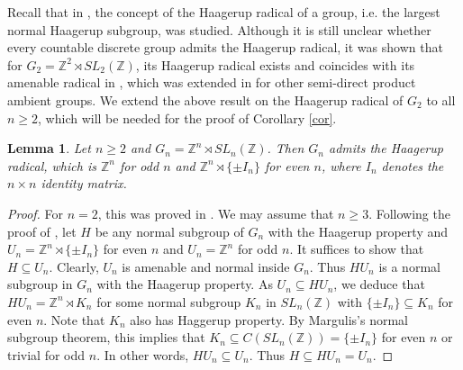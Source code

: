 \documentclass[12pt]{amsart}
\newtheorem{lem}[theorem]{Lemma}
\theoremstyle{definition}
\theoremstyle{remark}
\begin{document}
Recall that in \cite{jiangskalski}, the concept of the Haagerup radical of a group, i.e. the largest normal Haagerup subgroup, was studied. Although it is still unclear whether every countable discrete group admits the Haagerup radical, it was shown that for $G_2=\mathbb{Z}^2\rtimes SL_2(\mathbb{Z})$, its Haagerup radical exists and coincides with its amenable radical in \cite[Proposition 2.10]{jiangskalski}, which was extended in \cite[Proposition 4.1]{valette} for other semi-direct product ambient groups.
We extend the above result on the Haagerup radical of $G_2$ to all $n\geq 2$, which will be needed for the proof of Corollary \ref{cor}.

\begin{lem}\label{lem: Haagerup radical in G_n}
Let $n\geq 2$ and $G_n=\mathbb{Z}^n\rtimes SL_n(\mathbb{Z})$. Then $G_n$ admits the Haagerup radical, which is $\mathbb{Z}^n$ for odd $n$ and $\mathbb{Z}^n\rtimes \{\pm I_n\}$ for even $n$, where $I_n$ denotes the $n\times n$ identity matrix.
\end{lem}
\begin{proof}
    For $n=2$, this was proved in \cite[Proposition 2.10]{jiangskalski}. We may assume that $n\geq 3$. Following the proof of \cite[Proposition 2.10]{jiangskalski}, let $H$ be any normal subgroup of $G_n$ with the Haagerup property and $U_n=\mathbb{Z}^n\rtimes \{\pm I_n\}$ for even $n$ and $U_n=\mathbb{Z}^n$ for odd $n$. It suffices to show that $H\subseteq U_n$. Clearly, $U_n$ is amenable and normal inside $G_n$. Thus $HU_n$ is a normal subgroup in $G_n$ with the Haagerup property. As $U_n\subseteq HU_n$, we deduce that $HU_n=\mathbb{Z}^n\rtimes K_n$ for some normal subgroup $K_n$ in $SL_n(\mathbb{Z})$ with $\{\pm I_n\}\subseteq K_n$ for even $n$. Note that $K_n$ also has Haggerup property. By Margulis's normal subgroup theorem, this implies that $K_n\subseteq C(SL_n(\mathbb{Z}))=\{\pm I_n\}$ for even $n$ or trivial for odd $n$. In other words, $HU_n\subseteq U_n$. Thus $H\subseteq HU_n=U_n$.
\end{proof}
\end{document}
